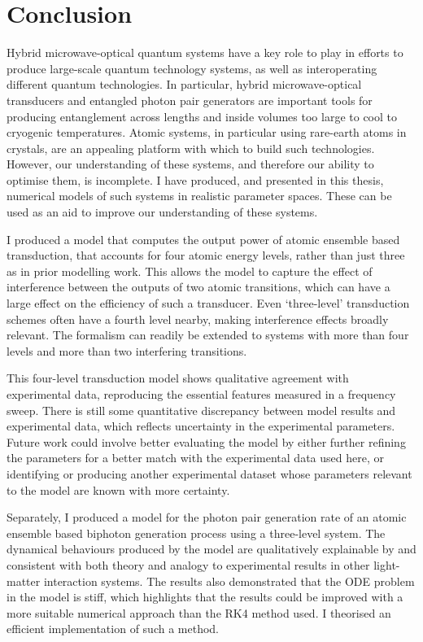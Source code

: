 \chapter{\label{ch:conclusion}Conclusion}

Hybrid microwave-optical quantum systems have a key role to play in efforts to produce large-scale quantum technology systems, as well as interoperating different quantum technologies. In particular, hybrid microwave-optical transducers and entangled photon pair generators are important tools for producing entanglement across lengths and inside volumes too large to cool to cryogenic temperatures. Atomic systems, in particular using rare-earth atoms in crystals, are an appealing platform with which to build such technologies. However, our understanding of these systems, and therefore our ability to optimise them, is incomplete. I have produced, and presented in this thesis, numerical models of such systems in realistic parameter spaces. These can be used as an aid to improve our understanding of these systems.

I produced a model that computes the output power of atomic ensemble based transduction, that accounts for four atomic energy levels, rather than just three as in prior modelling work. This allows the model to capture the effect of interference between the outputs of two atomic transitions, which can have a large effect on the efficiency of such a transducer. Even `three-level' transduction schemes often have a fourth level nearby, making interference effects broadly relevant. The formalism can readily be extended to systems with more than four levels and more than two interfering transitions.

This four-level transduction model shows qualitative agreement with experimental data, reproducing the essential features measured in a frequency sweep. There is still some quantitative discrepancy between model results and experimental data, which reflects uncertainty in the experimental parameters. Future work could involve better evaluating the model by either further refining the parameters for a better match with the experimental data used here, or identifying or producing another experimental dataset whose parameters relevant to the model are known with more certainty.

Separately, I produced a model for the photon pair generation rate of an atomic ensemble based biphoton generation process using a three-level system. The dynamical behaviours produced by the model are qualitatively explainable by and consistent with both theory and analogy to experimental results in other light-matter interaction systems. The results also demonstrated that the ODE problem in the model is stiff, which highlights that the results could be improved with a more suitable numerical approach than the RK4 method used. I theorised an efficient implementation of such a method.

